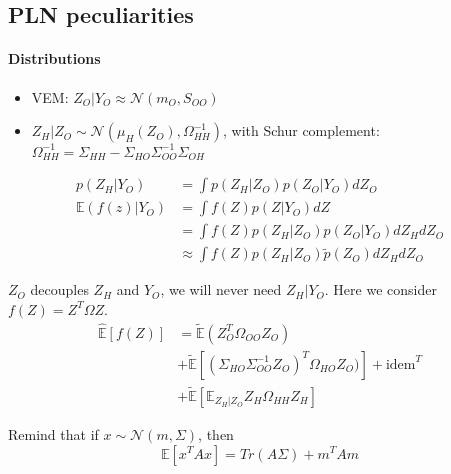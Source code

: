 \documentclass[11pt,a4paper]{article}
\newcommand{\Esp}{\mathds{E}}
\begin{document}
\subsection{PLN peculiarities}
\paragraph{Distributions}
\begin{itemize}
\item VEM: $Z_O|Y_O \approx \mathcal{N}(m_O,S_{OO})$

\item $Z_H|Z_O \sim \mathcal{N}(\mu_H(Z_O), \Omega_{HH}^{-1})$, with Schur complement: $\Omega_{HH}^{-1} = \Sigma_{HH} -\Sigma_{HO}\Sigma_{OO}^{-1}\Sigma_{OH}$
\end{itemize}

\begin{align*}
p(Z_H|Y_O)&=\int p(Z_H|Z_O) p(Z_O|Y_O) dZ_O\\
\Esp(f(z)|Y_O) &=\int f(Z) p(Z|Y_O) dZ\\
&=\int f(Z) p(Z_H|Z_O) p(Z_O|Y_O) dZ_H dZ_O\\
&\approx \int f(Z) p(Z_H|Z_O)\tilde{p}(Z_O) dZ_H dZ_O
\end{align*}



$Z_O$ decouples $Z_H$ and $Y_O$, we will never need $Z_H|Y_O$. Here we consider $f(Z) = Z^T\Omega Z$.
\begin{align*}
\widehat{\Esp}[f(Z)] &= \tilde{\Esp}(Z_O^T\Omega_{OO}Z_O)\\
& +\tilde{\Esp}\left[(\Sigma_{HO}\Sigma_{OO}^{-1} Z_O)^T \Omega_{HO}Z_O)\right]+ \text{idem}^T \\
&+ \tilde{\Esp}\left[\Esp_{Z_H|Z_O}Z_H\Omega_{HH}Z_H\right]
\end{align*}

Remind that if $x\sim\mathcal{N}(m, \Sigma)$, then
$$\Esp[x^TAx] = Tr(A\Sigma) + m^TAm$$
\end{document}
